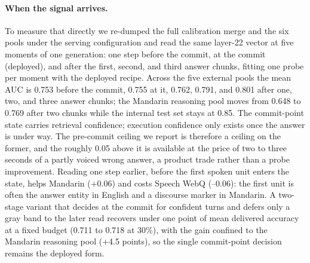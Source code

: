 \paragraph{When the signal arrives.}
To measure that directly we re-dumped the full calibration merge and
the six pools under the serving configuration and read the same
layer-22 vector at five moments of one generation: one step before
the commit, at the commit (deployed), and after the first, second, and
third answer chunks, fitting one probe per moment with the deployed
recipe. Across the five external pools the mean AUC is 0.753 before
the commit, 0.755 at it, 0.762, 0.791, and 0.801 after one, two, and
three answer chunks; the Mandarin reasoning pool moves from 0.648 to
0.769 after two chunks while the internal test set stays at 0.85. The
commit-point state carries retrieval confidence; execution confidence
only exists once the answer is under way. The pre-commit ceiling we
report is therefore a ceiling on the former, and the roughly 0.05 above
it is available at the price of two to three seconds of a partly voiced
wrong answer, a product trade rather than a probe improvement. Reading
one step earlier, before the first spoken unit enters the state, helps
Mandarin (+0.06) and costs Speech WebQ (--0.06): the first unit is
often the answer entity in English and a discourse marker in Mandarin.
A two-stage variant that decides at the commit for confident turns and
defers only a gray band to the later read recovers under one point of
mean delivered accuracy at a fixed budget (0.711 to 0.718 at 30\%),
with the gain confined to the Mandarin reasoning pool (+4.5 points),
so the single commit-point decision remains the deployed form.
